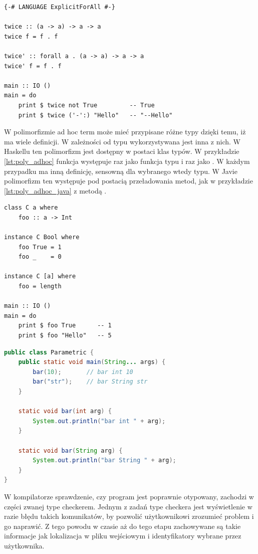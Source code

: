 {\begin{lstlisting}[float,label={lst:poly_parametric},
                   caption={Przykład użycia polimorfizmu parametrycznego w Haskellu.}]
{-# LANGUAGE ExplicitForAll #-}

twice :: (a -> a) -> a -> a
twice f = f . f

twice' :: forall a . (a -> a) -> a -> a
twice' f = f . f

main :: IO ()
main = do
    print $ twice not True         -- True
    print $ twice ('-':) "Hello"   -- "--Hello"
\end{lstlisting}

W polimorfizmie ad hoc term może mieć przypisane różne typy dzięki temu,
iż ma wiele definicji. W zależności od typu wykorzystywana jest inna z nich.
W Haskellu ten polimorfizm jest dostępny w postaci klas typów\cite{TAPL}.
W przykładzie \ref{lst:poly_adhoc} funkcja  występuje raz jako
funkcja typu  i raz jako . W każdym
przypadku ma inną definicję, sensowną dla wybranego wtedy typu. W Javie
polimorfizm ten występuje pod postacią przeładowania metod, jak w przykładzie
\ref{lst:poly_adhoc_java} z metodą .

\begin{lstlisting}[float,label={lst:poly_adhoc},
                   caption={Przykład użycia polimorfizmu ad hoc w Haskellu.}]
class C a where
    foo :: a -> Int

instance C Bool where
    foo True = 1
    foo _    = 0

instance C [a] where
    foo = length

main :: IO ()
main = do
    print $ foo True      -- 1
    print $ foo "Hello"   -- 5
\end{lstlisting}

\begin{lstlisting}[float,language=Java,label={lst:poly_adhoc_java},
                   caption={Przykład użycia polimorfizmu ad hoc w Javie.}]
public class Parametric {
    public static void main(String... args) {
        bar(10);       // bar int 10
        bar("str");    // bar String str
    }

    static void bar(int arg) {
        System.out.println("bar int " + arg);
    }

    static void bar(String arg) {
        System.out.println("bar String " + arg);
    }
}
\end{lstlisting}

W kompilatorze sprawdzenie, czy program jest poprawnie otypowany, zachodzi w części
zwanej type checkerem. Jednym z zadań type checkera jest wyświetlenie w razie błędu takich
komunikatów, by pozwolić użytkownikowi zrozumieć problem i go naprawić.
Z tego powodu w czasie aż do tego etapu zachowywane są takie informacje
jak lokalizacja w pliku wejściowym i identyfikatory wybrane przez użytkownika.

}
